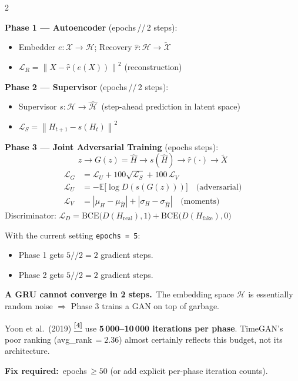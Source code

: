 \documentclass[10pt]{article}
\newcommand{\tealbox}[2]{\begin{tcolorbox}[mybox={Teal}{LBg},title={#1}]#2\end{tcolorbox}}
\newcommand{\redbox}[2]{\begin{tcolorbox}[mybox={DRed}{RBg},title={#1}]#2\end{tcolorbox}}
\newcommand{\tcite}[1]{%
  \hyperlink{R:#1}{\textsuperscript{\scriptsize\textbf{[#1]}}}}
\newcommand{\E}{\mathbb{E}}
\newcommand{\norm}[1]{\left\|#1\right\|}
\begin{document}
\begin{multicols}{2}
\columnbreak

\tealbox{The Four-Phase Training Algorithm}{%
\textbf{Phase 1 --- Autoencoder} (epochs\,//\,2 steps):
\begin{itemize}
  \item Embedder $e: \mathcal{X} \to \mathcal{H}$; Recovery $\hat{r}: \mathcal{H} \to \tilde{\mathcal{X}}$
  \item $\mathcal{L}_R = \norm{X - \hat{r}(e(X))}^2$ \quad (reconstruction)
\end{itemize}

\textbf{Phase 2 --- Supervisor} (epochs\,//\,2 steps):
\begin{itemize}
  \item Supervisor $s: \mathcal{H} \to \hat{\mathcal{H}}$\ (step-ahead prediction in latent space)
  \item $\mathcal{L}_S = \norm{H_{t+1} - s(H_t)}^2$
\end{itemize}

\textbf{Phase 3 --- Joint Adversarial Training} (epochs steps):
\begin{equation*}
  z \to G(z)=\hat{H} \to s(\hat{H}) \to \hat{r}(\cdot) \to \tilde{X}
\end{equation*}
\begin{align*}
  \mathcal{L}_G &= \mathcal{L}_U + 100\sqrt{\mathcal{L}_S} + 100\,\mathcal{L}_V \\[2pt]
  \mathcal{L}_U &= -\E\!\bigl[\log D(s(G(z)))\bigr] \quad\text{(adversarial)} \\
  \mathcal{L}_V &= |\mu_H - \mu_{\hat{H}}| + |\sigma_H - \sigma_{\hat{H}}| \quad\text{(moments)}
\end{align*}
Discriminator: $\mathcal{L}_D = \text{BCE}\!\bigl(D(H_\text{real}),1\bigr) + \text{BCE}\!\bigl(D(H_\text{fake}),0\bigr)$}

\redbox{Critical Issue: Training Budget}{%
With the current setting \texttt{epochs = 5}:
\begin{itemize}
  \item Phase 1 gets $5 // 2 = 2$ gradient steps.
  \item Phase 2 gets $5 // 2 = 2$ gradient steps.
\end{itemize}
\textbf{A GRU cannot converge in 2 steps.}\ The embedding space $\mathcal{H}$ is essentially random noise $\Rightarrow$ Phase 3 trains a GAN on top of garbage.

Yoon et al.\ (2019)\tcite{4} use \textbf{5\,000--10\,000 iterations per phase}. TimeGAN's poor ranking (avg\_rank\,$= 2.36$) almost certainly reflects this budget, not its architecture.

\textbf{Fix required:}\ epochs\,$\geq 50$ (or add explicit per-phase iteration counts).}

\end{multicols}
\end{document}

